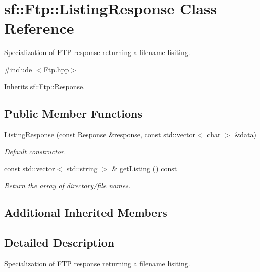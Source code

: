\hypertarget{classsf_1_1_ftp_1_1_listing_response}{\section{sf\+:\+:Ftp\+:\+:Listing\+Response Class Reference}
\label{classsf_1_1_ftp_1_1_listing_response}
}


Specialization of F\+T\+P response returning a filename lisiting.  




{\ttfamily \#include $<$Ftp.\+hpp$>$}



Inherits \hyperlink{classsf_1_1_ftp_1_1_response}{sf\+::\+Ftp\+::\+Response}.

\subsection*{Public Member Functions}
\begin{DoxyCompactItemize}
\item 
\hyperlink{classsf_1_1_ftp_1_1_listing_response_aefc1b85e59ee0c3ee180666b4a4631e4}{Listing\+Response} (const \hyperlink{classsf_1_1_ftp_1_1_response}{Response} \&response, const std\+::vector$<$ char $>$ \&data)
\begin{DoxyCompactList}\small\item\em Default constructor. \end{DoxyCompactList}\item 
const std\+::vector$<$ std\+::string $>$ \& \hyperlink{classsf_1_1_ftp_1_1_listing_response_a5f0771b52a966bf25b33a70602b6f97f}{get\+Listing} () const 
\begin{DoxyCompactList}\small\item\em Return the array of directory/file names. \end{DoxyCompactList}\end{DoxyCompactItemize}
\subsection*{Additional Inherited Members}


\subsection{Detailed Description}
Specialization of F\+T\+P response returning a filename lisiting. 


